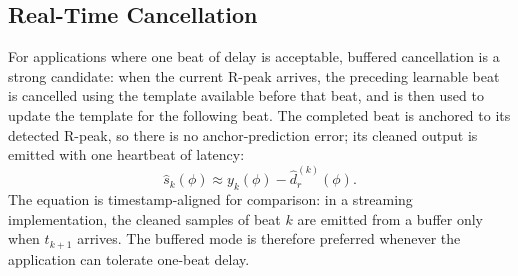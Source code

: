 \documentclass[conference]{IEEEtran}
\begin{document}
\subsection{Real-Time Cancellation}
\label{sec:real_time}

For applications where one beat of delay is acceptable, buffered cancellation is a strong candidate:
when the current R-peak arrives, the preceding learnable beat is cancelled using the template available
before that beat, and is then used to update the template for the following beat. The completed beat is
anchored to its detected R-peak, so there is no anchor-prediction error; its cleaned output is emitted
with one heartbeat of latency:
\begin{equation}
\widehat{s}_{k}(\phi) \approx y_{k}(\phi) - \hat{d}_r^{(k)}(\phi).
\label{eq:causal_ilc_buffered}
\end{equation}
The equation is timestamp-aligned for comparison: in a streaming implementation, the cleaned samples
of beat $k$ are emitted from a buffer only when $t_{k+1}$ arrives.
The buffered mode is therefore preferred whenever the application can tolerate one-beat delay.
\end{document}

